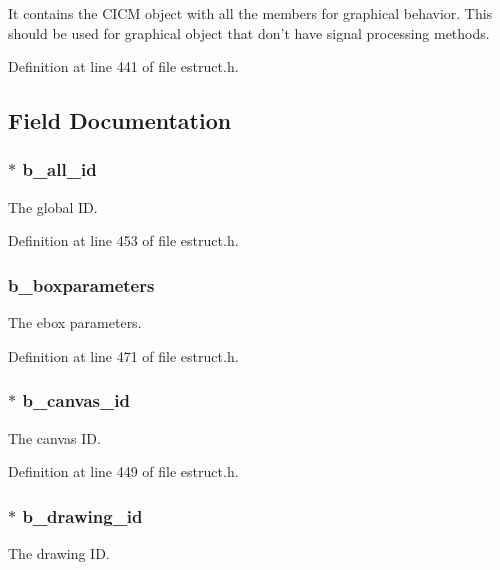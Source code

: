 It contains the C\-I\-C\-M object with all the members for graphical behavior. This should be used for graphical object that don't have signal processing methods. 

Definition at line 441 of file estruct.\-h.



\subsection{Field Documentation}
\hypertarget{struct__ebox_a0f63dcf604135dd4fbfbf43eaed53c1a}{
\subsubsection[{b\-\_\-all\-\_\-id}]{$\ast$ b\-\_\-all\-\_\-id}}\label{struct__ebox_a0f63dcf604135dd4fbfbf43eaed53c1a}
The global I\-D. 

Definition at line 453 of file estruct.\-h.

\hypertarget{struct__ebox_a01fa53a36dc717c81755d805a868ad9d}{
\subsubsection[{b\-\_\-boxparameters}]{ b\-\_\-boxparameters}}\label{struct__ebox_a01fa53a36dc717c81755d805a868ad9d}
The ebox parameters. 

Definition at line 471 of file estruct.\-h.

\hypertarget{struct__ebox_ac0251c6969a1032f8f50d076e909fb3e}{
\subsubsection[{b\-\_\-canvas\-\_\-id}]{$\ast$ b\-\_\-canvas\-\_\-id}}\label{struct__ebox_ac0251c6969a1032f8f50d076e909fb3e}
The canvas I\-D. 

Definition at line 449 of file estruct.\-h.

\hypertarget{struct__ebox_a153f9c9929d722ecb29217f3fb0914c9}{
\subsubsection[{b\-\_\-drawing\-\_\-id}]{$\ast$ b\-\_\-drawing\-\_\-id}}\label{struct__ebox_a153f9c9929d722ecb29217f3fb0914c9}
The drawing I\-D. 


